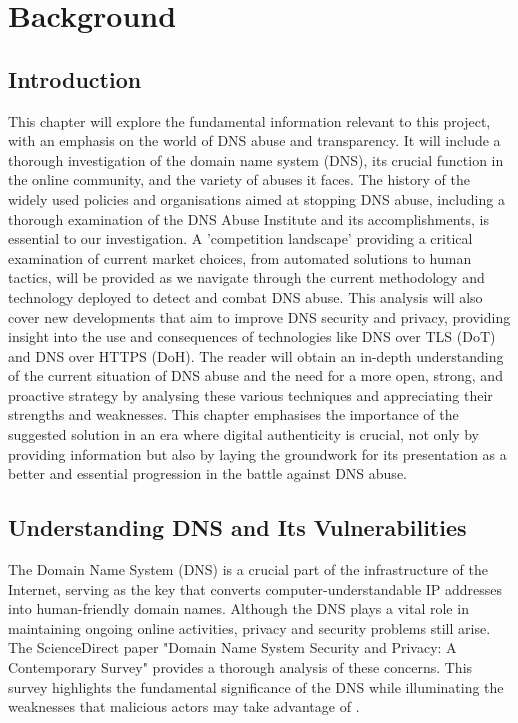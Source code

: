 \chapter{Background}
\label{Chapt2}
\section{Introduction}

This chapter will explore the fundamental information relevant to this project, with an emphasis on the world of DNS abuse and transparency. It will include a thorough investigation of the domain name system (DNS), its crucial function in the online community, and the variety of abuses it faces. The history of the widely used policies and organisations aimed at stopping DNS abuse, including a thorough examination of the DNS Abuse Institute and its accomplishments, is essential to our investigation. A 'competition landscape' providing a critical examination of current market choices, from automated solutions to human tactics, will be provided as we navigate through the current methodology and technology deployed to detect and combat DNS abuse.  This analysis will also cover new developments that aim to improve DNS security and privacy, providing insight into the use and consequences of technologies like DNS over TLS (DoT) and DNS over HTTPS (DoH). The reader will obtain an in-depth understanding of the current situation of DNS abuse and the need for a more open, strong, and proactive strategy by analysing these various techniques and appreciating their strengths and weaknesses. This chapter emphasises the importance of the suggested solution in an era where digital authenticity is crucial, not only by providing information but also by laying the groundwork for its presentation as a better and essential progression in the battle against DNS abuse.

\section{Understanding DNS and Its Vulnerabilities}

The Domain Name System (DNS) is a crucial part of the infrastructure of the Internet, serving as the key that converts computer-understandable IP addresses into human-friendly domain names. Although the DNS plays a vital role in maintaining ongoing online activities, privacy and security problems still arise. The ScienceDirect paper "Domain Name System Security and Privacy: A Contemporary Survey" provides a thorough analysis of these concerns. This survey highlights the fundamental significance of the DNS while illuminating the weaknesses that malicious actors may take advantage of \cite*{sciencedirect2023dns}.


